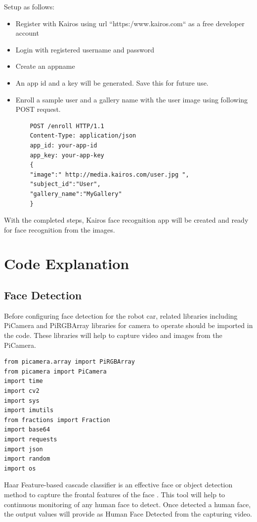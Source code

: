 \documentclass[sigconf]{acmart}
\begin{document}
Setup as follows:

\begin{itemize}
\item Register with Kairos using url ``https:/www.kairos.com`` as a free developer account
\item Login with registered username and password
\item Create an appname
\item An app id and a key will be generated. Save this for future use.
\item Enroll a sample user and a gallery name with the user image using following POST request.


    \begin{verbatim}
    POST /enroll HTTP/1.1
    Content-Type: application/json
    app_id: your-app-id
    app_key: your-app-key
    {
    "image":" http://media.kairos.com/user.jpg ",
    "subject_id":"User",
    "gallery_name":"MyGallery"
    }
    \end{verbatim}
\end{itemize}


With the completed steps, Kairos face recognition app will be created and ready for face 
recognition from the images.

\section{Code Explanation}
\subsection{Face Detection}
Before configuring face detection for the robot car, related libraries including PiCamera 
and PiRGBArray libraries for camera to operate should be imported in the code. These libraries 
will help to capture video and images from the PiCamera.


\begin{verbatim}
from picamera.array import PiRGBArray
from picamera import PiCamera
import time
import cv2
import sys
import imutils
from fractions import Fraction
import base64
import requests
import json
import random
import os
\end{verbatim}


Haar Feature-based cascade classifier is an effective face or object detection method to 
capture the frontal features of the face \cite{viola2001}. This tool will help to continuous 
monitoring of any human face to detect. Once detected a human face, the output values will 
provide as Human Face Detected from the capturing video.
\end{document}

